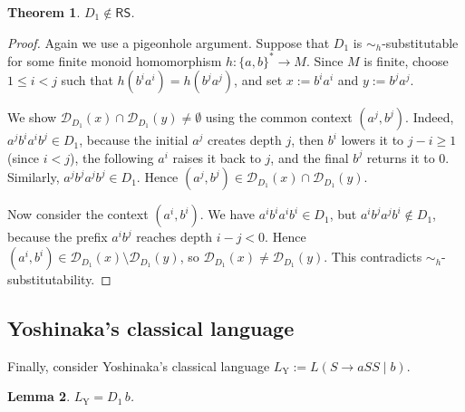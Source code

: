 \documentclass[11pt,a4paper]{article}
\newtheorem{theorem}{Theorem}[section]
\newtheorem{lemma}[theorem]{Lemma}
\newcommand{\D}{\mathcal{D}}
\begin{document}
\begin{theorem}\label{thm:dyck-not-rs}
$D_1\notin\mathsf{RS}$.
\end{theorem}

\begin{proof}
Again we use a pigeonhole argument. Suppose that $D_1$ is
$\sim_h$-substitutable for some finite monoid homomorphism
$h:\{a,b\}^*\to M$. Since $M$ is finite, choose $1\le i<j$ such that
$h(b^ia^i)=h(b^ja^j)$, and set $x:=b^ia^i$ and $y:=b^ja^j$.

We show $\D_{D_1}(x)\cap\D_{D_1}(y)\neq\emptyset$ using the common
context $(a^j,b^j)$. Indeed, $a^jb^ia^ib^j\in D_1$, because the initial
$a^j$ creates depth $j$, then $b^i$ lowers it to $j-i\ge1$ (since $i<j$),
the following $a^i$ raises it back to $j$, and the final $b^j$ returns it
to $0$. Similarly, $a^jb^ja^jb^j\in D_1$. Hence
$(a^j,b^j)\in\D_{D_1}(x)\cap\D_{D_1}(y)$.

Now consider the context $(a^i,b^i)$. We have $a^ib^ia^ib^i\in D_1$,
but $a^ib^ja^jb^i\notin D_1$, because the prefix $a^ib^j$ reaches
depth $i-j<0$. Hence $(a^i,b^i)\in\D_{D_1}(x)\setminus\D_{D_1}(y)$,
so $\D_{D_1}(x)\ne\D_{D_1}(y)$. This contradicts $\sim_h$-substitutability.
\end{proof}

\subsection{Yoshinaka's classical language}

Finally, consider Yoshinaka's classical language $L_{\mathrm{Y}}:=L(S\to aSS\mid b)$.

\begin{lemma}\label{lem:y-dyck-factorization}
$L_{\mathrm{Y}}=D_1\,b$.
\end{lemma}
\end{document}
